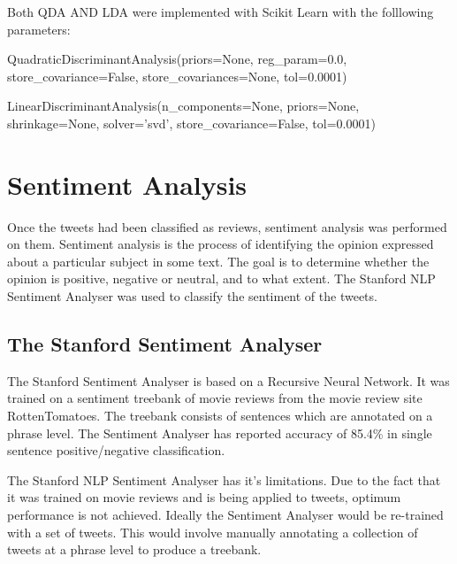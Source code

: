 Both QDA AND LDA were implemented with Scikit Learn with the folllowing parameters:

\begin{tcolorbox}
\begin{center}
	QuadraticDiscriminantAnalysis(priors=None, reg\_param=0.0, store\_covariance=False, store\_covariances=None, tol=0.0001)
\end{center}
\end{tcolorbox}

\begin{tcolorbox}
\begin{center}
	LinearDiscriminantAnalysis(n\_components=None, priors=None, shrinkage=None, solver='svd', store\_covariance=False, tol=0.0001)
\end{center}
\end{tcolorbox}


\section{Sentiment Analysis}

Once the tweets had been classified as reviews, sentiment analysis was performed on them. Sentiment analysis is the process of identifying the opinion expressed about a particular subject in some text. The goal is to determine whether the opinion is positive, negative or neutral, and to what extent. The Stanford NLP Sentiment Analyser \cite{stanfordSentiment2013} was used to classify the sentiment of the tweets.

\subsection*{The Stanford Sentiment Analyser}

The Stanford Sentiment Analyser is based on a Recursive Neural Network. It was trained on a sentiment treebank of movie reviews from the movie review site RottenTomatoes. The treebank consists of sentences which are annotated on a phrase level. The Sentiment Analyser has reported accuracy of 85.4\% in single sentence positive/negative classification. 

The Stanford NLP Sentiment Analyser has it's limitations. Due to the fact that it was trained on movie reviews and is being applied to tweets, optimum performance is not achieved. Ideally the Sentiment Analyser would be re-trained with a set of tweets. This would involve manually annotating a collection of tweets at a phrase level to produce a treebank.

